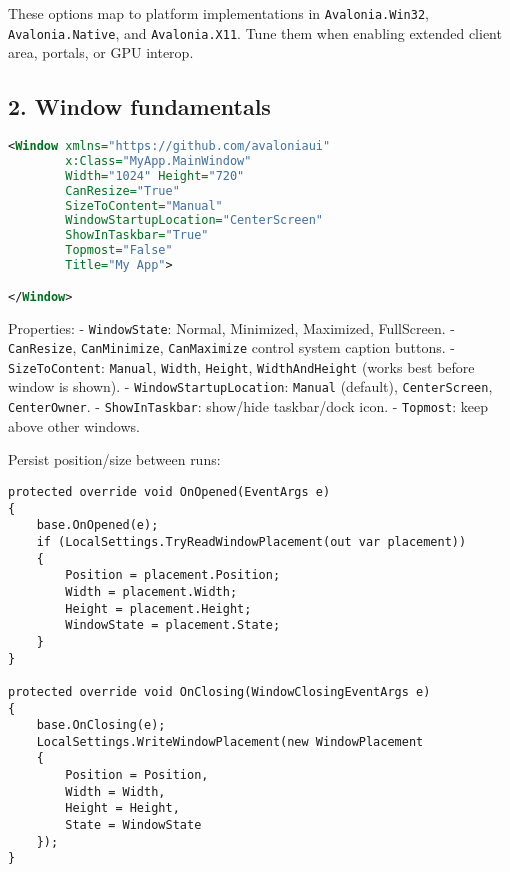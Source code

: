 These options map to platform implementations in
\passthrough{\lstinline!Avalonia.Win32!},
\passthrough{\lstinline!Avalonia.Native!}, and
\passthrough{\lstinline!Avalonia.X11!}. Tune them when enabling extended
client area, portals, or GPU interop.

\subsection{2. Window fundamentals}\label{window-fundamentals}

\begin{lstlisting}[language=XML]
<Window xmlns="https://github.com/avaloniaui"
        x:Class="MyApp.MainWindow"
        Width="1024" Height="720"
        CanResize="True"
        SizeToContent="Manual"
        WindowStartupLocation="CenterScreen"
        ShowInTaskbar="True"
        Topmost="False"
        Title="My App">

</Window>
\end{lstlisting}

Properties: - \passthrough{\lstinline!WindowState!}: Normal, Minimized,
Maximized, FullScreen. - \passthrough{\lstinline!CanResize!},
\passthrough{\lstinline!CanMinimize!},
\passthrough{\lstinline!CanMaximize!} control system caption buttons. -
\passthrough{\lstinline!SizeToContent!}:
\passthrough{\lstinline!Manual!}, \passthrough{\lstinline!Width!},
\passthrough{\lstinline!Height!},
\passthrough{\lstinline!WidthAndHeight!} (works best before window is
shown). - \passthrough{\lstinline!WindowStartupLocation!}:
\passthrough{\lstinline!Manual!} (default),
\passthrough{\lstinline!CenterScreen!},
\passthrough{\lstinline!CenterOwner!}. -
\passthrough{\lstinline!ShowInTaskbar!}: show/hide taskbar/dock icon. -
\passthrough{\lstinline!Topmost!}: keep above other windows.

Persist position/size between runs:

\begin{lstlisting}
protected override void OnOpened(EventArgs e)
{
    base.OnOpened(e);
    if (LocalSettings.TryReadWindowPlacement(out var placement))
    {
        Position = placement.Position;
        Width = placement.Width;
        Height = placement.Height;
        WindowState = placement.State;
    }
}

protected override void OnClosing(WindowClosingEventArgs e)
{
    base.OnClosing(e);
    LocalSettings.WriteWindowPlacement(new WindowPlacement
    {
        Position = Position,
        Width = Width,
        Height = Height,
        State = WindowState
    });
}
\end{lstlisting}

